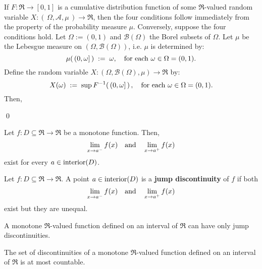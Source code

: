 \proof
If $F : \Re \longrightarrow [0,1]$ is a cumulative distribution function of some
$\Re$-valued random variable $X : \left(\,\Omega,\mathcal{A},\mu\,\right) \longrightarrow \Re$,
then the four conditions follow immediately from the property of the probability measure $\mu$.
Conversely, suppose the four conditions hold. Let $\Omega := (0,1)$ and $\mathcal{B}(\Omega)$ the Borel subsets of $\Omega$.
Let $\mu$ be the Lebesgue measure on $(\Omega,\mathcal{B}(\Omega))$, i.e. $\mu$ is determined by:
\begin{equation*}
\mu\!\left(\,(0,\omega]\,\right) \; := \; \omega,
\quad
\textnormal{for each $\omega \in \Omega = (0,1)$}.
\end{equation*}
Define the random variable $X : (\Omega,\mathcal{B}(\Omega),\mu) \longrightarrow \Re$ by:
\begin{equation*}
X(\omega) \; := \; \sup F^{-1}\!\left(\,(0,\omega]\,\right),
\quad
\textnormal{for each $\omega \in \Omega = (0,1)$}.
\end{equation*}
Then,

\qed

\begin{theorem}\quad
Let $f : D \subseteq \Re \longrightarrow \Re$ be a monotone function.
Then,
\begin{equation*}
\lim_{x \rightarrow a^{-}} f(x)
\quad\textnormal{and}\quad
\lim_{x \rightarrow a^{+}} f(x)
\end{equation*}
exist for every $a \in \textnormal{interior}(D)$.
\end{theorem}

\begin{definition}\quad
Let $f : D \subseteq \Re \longrightarrow \Re$.
A point $a \in \textnormal{interior}(D)$ is a \textbf{jump discontinuity} of $f$ if both
\begin{equation*}
\lim_{x \rightarrow a^{-}} f(x)
\quad\textnormal{and}\quad
\lim_{x \rightarrow a^{+}} f(x)
\end{equation*}
exist but they are unequal.
\end{definition}

\begin{corollary}\quad
A monotone $\Re$-valued function defined on an interval of $\Re$ can have only jump discontinuities.
\end{corollary}

\begin{theorem}\mbox{}\vskip 0.1cm
\noindent
The set of discontinuities of a monotone $\Re$-valued function defined on an interval of $\Re$ is at most countable.
\end{theorem}

